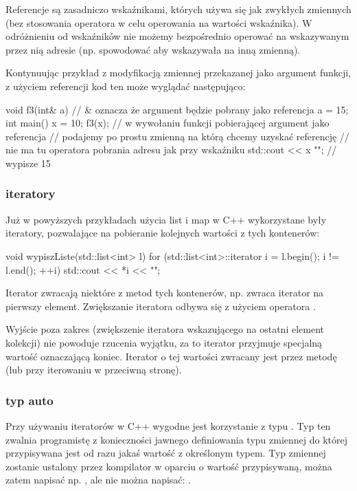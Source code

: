 Referencje są zasadniczo wskaźnikami, których używa się jak zwykłych zmiennych
(bez stosowania operatora \cpp{*} w celu operowania na wartości wskaźnika).
W odróżnieniu od wskaźników nie możemy bezpośrednio operować na wskazywanym
przez nią adresie (np. spowodować aby wskazywała na inną zmienną).

Kontynuując przykład z modyfikacją zmiennej przekazanej jako argument funkcji, z użyciem referencji kod ten może wyglądać następująco:

\begin{CodeFrame*}[cpp]{}
void f3(int& a) { // & oznacza że argument będzie pobrany jako referencja
    a = 15;
}
int main() {
    x = 10;
    f3(x); // w wywołaniu funkcji pobierającej argument jako referencja
           // podajemy po prostu zmienną na którą chcemy uzyskać referencję
           // nie ma tu operatora pobrania adresu jak przy wskaźniku
    std::cout << x "\n"; // wypisze 15
}
\end{CodeFrame*}

\subsubsection{iteratory}

Już w powyższych przykładach użycia list i map w C++
wykorzystane były iteratory, pozwalające na
pobieranie kolejnych wartości z tych kontenerów:

\begin{CodeFrame*}[cpp]{}
void wypiszListe(std::list<int> l) {
    for (std::list<int>::iterator i = l.begin(); i != l.end(); ++i) {
        std::cout << *i << "\n";
    }
}
\end{CodeFrame*}

Iterator zwracają niektóre z metod tych kontenerów,
np.  zwraca iterator na pierwszy element.
Zwiększanie iteratora odbywa się z użyciem operatora \cpp{++}.

Wyjście poza zakres (zwiększenie iteratora wskazującego na
ostatni element kolekcji) nie powoduje rzucenia wyjątku,
za to iterator przyjmuje specjalną wartość oznaczającą koniec.
Iterator o tej wartości zwracany jest przez metodę 
(lub  przy iterowaniu w przeciwną stronę).

\subsubsection{typ auto}

Przy używaniu iteratorów w C++ wygodne jest korzystanie
z typu . Typ ten zwalnia programistę z konieczności
jawnego definiowania typu zmiennej do której przypisywana
jest od razu jakaś wartość z określonym typem.
Typ zmiennej zostanie ustalony przez kompilator w oparciu o
wartość przypisywaną, można zatem napisać np. ,
ale nie można napisać: .

